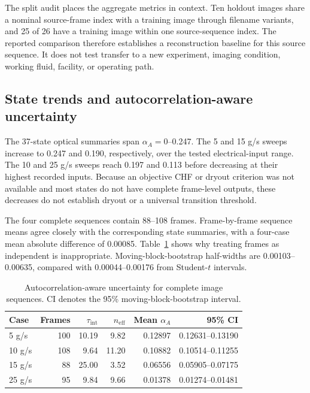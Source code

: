 \documentclass[preprint,12pt,sort&compress]{elsarticle}
\begin{document}
The split audit places the aggregate metrics in context. Ten holdout images share a nominal source-frame index with a training image through filename variants, and 25 of 26 have a training image within one source-sequence index. The reported comparison therefore establishes a reconstruction baseline for this source sequence. It does not test transfer to a new experiment, imaging condition, working fluid, facility, or operating path.

\subsection{State trends and autocorrelation-aware uncertainty}

The 37-state optical summaries span $\alpha_A=0$--0.247. The 5 and 15 g/s sweeps increase to 0.247 and 0.190, respectively, over the tested electrical-input range. The 10 and 25 g/s sweeps reach 0.197 and 0.113 before decreasing at their highest recorded inputs. Because an objective CHF or dryout criterion was not available and most states do not have complete frame-level outputs, these decreases do not establish dryout or a universal transition threshold.

The four complete sequences contain 88--108 frames. Frame-by-frame sequence means agree closely with the corresponding state summaries, with a four-case mean absolute difference of 0.00085. Table~\ref{tab:temporal} shows why treating frames as independent is inappropriate. Moving-block-bootstrap half-widths are 0.00103--0.00635, compared with 0.00044--0.00176 from Student-$t$ intervals.

\begin{table}[htbp]
  \centering
  \caption{Autocorrelation-aware uncertainty for complete image sequences. CI denotes the 95\% moving-block-bootstrap interval.}
  \label{tab:temporal}
  \begin{tabular}{lrrrrr}
    \toprule
    Case & Frames & $\tau_{\mathrm{int}}$ & $n_{\mathrm{eff}}$ & Mean $\alpha_A$ & 95\% CI \\
    \midrule
    5 g/s  & 100 & 10.19 & 9.82 & 0.12897 & 0.12631--0.13190 \\
    10 g/s & 108 & 9.64  & 11.20 & 0.10882 & 0.10514--0.11255 \\
    15 g/s & 88  & 25.00 & 3.52 & 0.06556 & 0.05905--0.07175 \\
    25 g/s & 95  & 9.84  & 9.66 & 0.01378 & 0.01274--0.01481 \\
    \bottomrule
  \end{tabular}
\end{table}
\end{document}
